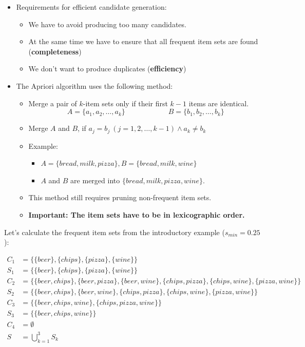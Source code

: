 \begin{frame}
	\begin{itemize}
		\item Requirements for efficient candidate generation:
		\begin{itemize}
			\item We have to avoid producing too many candidates.
			\item At the same time we have to ensure that all frequent item sets are found (\textbf{completeness})
			\item We don't want to produce duplicates (\textbf{efficiency})
		\end{itemize}
		\item The Apriori algorithm uses the following method:
		\begin{itemize}
			\item Merge a pair of $k$-item sets only if their first $k - 1$ items are identical.
			\begin{equation}
				A = \{ a_1, a_2, \dots, a_{k} \} \qquad\qquad\qquad B = \{ b_1, b_2, \dots, b_{k} \}
			\end{equation}
			\item Merge $A$ and $B$, if $a_j = b_j\ (j = 1, 2, \dots, k - 1) \wedge a_{k} \ne b_{k}$
			\item Example:
			\begin{itemize}
				\item $A = \{ bread, milk, pizza \}, B = \{ bread, milk, wine \}$
				\item $A$ and $B$ are merged into $\{ bread, milk, pizza, wine \}$.
			\end{itemize}
			\item This method still requires pruning non-frequent item sets.
			\item \textbf{Important: The item sets have to be in lexicographic order.}
		\end{itemize}
	\end{itemize}
\end{frame}


\begin{frame}
	Let's calculate the frequent item sets from the introductory example ($s_{min} = 0.25$):
	
	\begin{align*}
		C_1 	&= \{ \{ beer \}, \{ chips \}, \{ pizza \}, \{ wine \} \} \\
		S_1 	&= \{ \{ beer \}, \{ chips \}, \{ pizza \}, \{ wine \} \} \\
		C_2 	&= \{ \{ beer, chips \}, \{ beer, pizza \}, \{ beer, wine \}, \{ chips, pizza \}, \{ chips, wine \}, \{ pizza, wine \} \} \\
		S_2 	&= \{ \{ beer, chips \}, \{ beer, wine \}, \{ chips, pizza \}, \{ chips, wine \}, \{ pizza, wine \} \} \\
		C_3 	&= \{ \{ beer, chips, wine \}, \{ chips, pizza, wine \} \} \\
		S_3 	&= \{ \{ beer, chips, wine \} \} \\
		C_4 	&= \emptyset \\
		S 	&= \bigcup_{k=1}^3 S_k
	\end{align*}
\end{frame}


